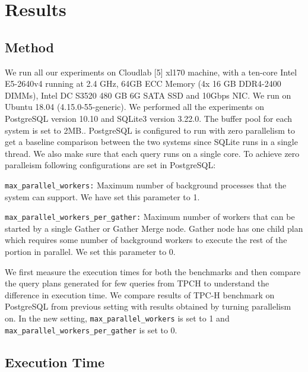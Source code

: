 \section{Results}
\label{sec:results}

\subsection{Method}
We run all our experiments on Cloudlab [5] xl170 machine, with a ten-core Intel E5-2640v4 running at 2.4 GHz, 64GB ECC Memory (4x 16 GB DDR4-2400 DIMMs), Intel DC S3520 480 GB 6G SATA SSD and 10Gbps NIC. We run on Ubuntu 18.04 (4.15.0-55-generic). We performed all the experiments on PostgreSQL version 10.10 and SQLite3 version 3.22.0. The buffer pool for each system is set to 2MB.. PostgreSQL is configured to run with zero parallelism to get a baseline comparison between the two systems since SQLite runs in a single thread. We also make sure that each query runs on a single core. To achieve zero paralleism following configurations are set in PostgreSQL:

\texttt{max\_parallel\_workers:} Maximum number of background processes that the system can support.
We have set this parameter to 1.

\texttt{max\_parallel\_workers\_per\_gather:} Maximum number of workers that can be started by a single Gather or Gather Merge node. Gather node has one child plan which requires some number of background workers to execute the rest of the portion in parallel. We set this parameter to 0.

We first measure the execution times for both the benchmarks and then compare the query plans generated for few queries from TPCH to understand the difference in execution time.
We compare results of TPC-H benchmark on PostgreSQL from previous setting with results obtained by turning parallelism on. In the new setting, \texttt{max\_parallel\_workers} is set to 1 and \texttt{max\_parallel\_workers\_per\_gather} is set to 0.

\subsection{Execution Time}
\label{sec:time}


